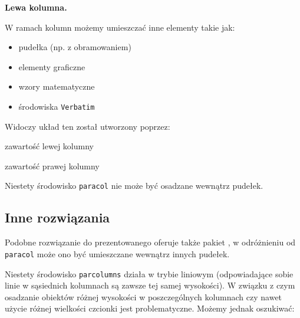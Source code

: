 \documentclass[fontSize=10pt,extra]{pdfArticle}
\begin{document}
\columnsep=0pt
\begin{paracol}{3}

\begin{nthcolumn}{0}
\textbf{Lewa kolumna.}

W ramach kolumn możemy umieszczać inne elementy takie jak:
\begin{itemize}
\item pudełka (np. z obramowaniem)
\item elementy graficzne
\item wzory matematyczne
\item środowiska \Verb$Verbatim$
\end{itemize}

Widoczy układ ten został utworzony poprzez:
\begin{MintedCode}
\columnsep=0pt
\begin{paracol}{3}
  \begin{nthcolumn}{0}
    zawartość lewej kolumny
  \end{nthcolumn}
  \begin{nthcolumn}{2}
    zawartość prawej kolumny
  \end{nthcolumn}
\end{paracol}
\end{MintedCode}

Niestety środowisko \Verb$paracol$ nie może być osadzane wewnątrz pudełek.

\subsection{Inne rozwiązania}

Podobne rozwiązanie do prezentowanego oferuje także pakiet ,
w odróżnieniu od \texttt{paracol} może ono być umieszczane wewnątrz innych pudełek.

Niestety środowisko \texttt{parcolumns} działa w trybie liniowym
(odpowiadające sobie linie w sąsiednich kolumnach są zawsze tej samej wysokości).
W związku z czym osadzanie obiektów różnej wysokości w poszczególnych kolumnach
czy nawet użycie różnej wielkości czcionki jest problematyczne.
Możemy jednak oszukiwać:


\end{nthcolumn}
\end{paracol}
\end{document}
